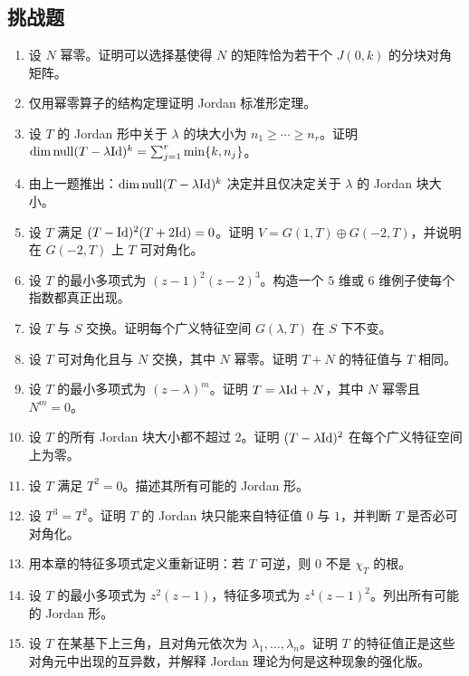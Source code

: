 \subsection*{挑战题}
\begin{enumerate}[resume, label=\textbf{\arabic*.}, leftmargin=*, itemsep=0.5em]
\item \hard 设 $N$ 幂零。证明可以选择基使得 $N$ 的矩阵恰为若干个 $J(0,k)$ 的分块对角矩阵。
\item \hard 仅用幂零算子的结构定理证明 Jordan 标准形定理。
\item \hard 设 $T$ 的 Jordan 形中关于 $\lambda$ 的块大小为 $n_1\ge\cdots\ge n_r$。证明 $\dim\mathrm{null}(T-\lambda\mathrm{Id})^k=\sum_{j=1}^r \min\{k,n_j\}$。
\item \hard 由上一题推出：$\dim\mathrm{null}(T-\lambda\mathrm{Id})^k$ 决定并且仅决定关于 $\lambda$ 的 Jordan 块大小。
\item \hard 设 $T$ 满足 $(T-\mathrm{Id})^2(T+2\mathrm{Id})=0$。证明 $V=G(1,T)\oplus G(-2,T)$，并说明在 $G(-2,T)$ 上 $T$ 可对角化。
\item \hard 设 $T$ 的最小多项式为 $(z-1)^2(z-2)^3$。构造一个 $5$ 维或 $6$ 维例子使每个指数都真正出现。
\item \hard 设 $T$ 与 $S$ 交换。证明每个广义特征空间 $G(\lambda,T)$ 在 $S$ 下不变。
\item \hard 设 $T$ 可对角化且与 $N$ 交换，其中 $N$ 幂零。证明 $T+N$ 的特征值与 $T$ 相同。
\item \hard 设 $T$ 的最小多项式为 $(z-\lambda)^m$。证明 $T=\lambda\mathrm{Id}+N$，其中 $N$ 幂零且 $N^m=0$。
\item \hard 设 $T$ 的所有 Jordan 块大小都不超过 $2$。证明 $(T-\lambda\mathrm{Id})^2$ 在每个广义特征空间上为零。
\item \hard 设 $T$ 满足 $T^2=0$。描述其所有可能的 Jordan 形。
\item \hard 设 $T^3=T^2$。证明 $T$ 的 Jordan 块只能来自特征值 $0$ 与 $1$，并判断 $T$ 是否必可对角化。
\item \hard 用本章的特征多项式定义重新证明：若 $T$ 可逆，则 $0$ 不是 $\chi_T$ 的根。
\item \hard 设 $T$ 的最小多项式为 $z^2(z-1)$，特征多项式为 $z^4(z-1)^2$。列出所有可能的 Jordan 形。
\item \hard 设 $T$ 在某基下上三角，且对角元依次为 $\lambda_1,\dots,\lambda_n$。证明 $T$ 的特征值正是这些对角元中出现的互异数，并解释 Jordan 理论为何是这种现象的强化版。
\end{enumerate}

